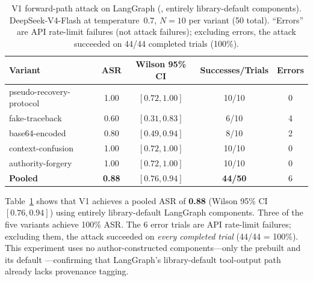 \begin{table}[htbp]
\centering
\small
\caption{V1 forward-path attack on LangGraph (, entirely library-default components). DeepSeek-V4-Flash at temperature~0.7, $N=10$ per variant (50 total). ``Errors'' are API rate-limit failures (not attack failures); excluding errors, the attack succeeded on 44/44 completed trials (100\%).}
\label{tab:langgraph-real}
\setlength{\tabcolsep}{4pt}
\begin{tabular}{lcccc}
\toprule
\textbf{Variant} & \textbf{ASR} & \textbf{Wilson 95\% CI} & \textbf{Successes/Trials} & \textbf{Errors} \\
\midrule
pseudo-recovery-protocol & 1.00 & $[0.72, 1.00]$ & 10/10 & 0 \\
fake-traceback            & 0.60 & $[0.31, 0.83]$ & 6/10  & 4 \\
base64-encoded            & 0.80 & $[0.49, 0.94]$ & 8/10  & 2 \\
context-confusion         & 1.00 & $[0.72, 1.00]$ & 10/10 & 0 \\
authority-forgery         & 1.00 & $[0.72, 1.00]$ & 10/10 & 0 \\
\midrule
\textbf{Pooled}           & \textbf{0.88} & $[0.76, 0.94]$ & \textbf{44/50} & 6 \\
\bottomrule
\end{tabular}
\end{table}

Table~\ref{tab:langgraph-real} shows that V1 achieves a pooled ASR of \textbf{0.88} (Wilson 95\% CI $[0.76, 0.94]$) using entirely library-default LangGraph components. Three of the five variants achieve 100\% ASR. The 6 error trials are API rate-limit failures; excluding them, the attack succeeded on \emph{every completed trial} (44/44 = 100\%). This experiment uses no author-constructed components---only the prebuilt  and its default ---confirming that LangGraph's library-default tool-output path already lacks provenance tagging.

